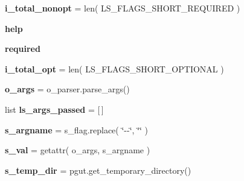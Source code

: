\begin{DoxyCompactItemize}
\item 
{\bfseries i\+\_\+total\+\_\+nonopt} = len( L\+S\+\_\+\+F\+L\+A\+G\+S\+\_\+\+S\+H\+O\+R\+T\+\_\+\+R\+E\+Q\+U\+I\+R\+ED )\hypertarget{namespacenegui_1_1pgdriveneestimator_aa4e6982ff99236ac13e0af4c4d6e8839}{}\label{namespacenegui_1_1pgdriveneestimator_aa4e6982ff99236ac13e0af4c4d6e8839}

\item 
{\bfseries help}\hypertarget{namespacenegui_1_1pgdriveneestimator_ad407ca10f30961eabc0630c21fe8da45}{}\label{namespacenegui_1_1pgdriveneestimator_ad407ca10f30961eabc0630c21fe8da45}

\item 
{\bfseries required}\hypertarget{namespacenegui_1_1pgdriveneestimator_ab5c3d005ba8659dc07a5f3171c7214df}{}\label{namespacenegui_1_1pgdriveneestimator_ab5c3d005ba8659dc07a5f3171c7214df}

\item 
{\bfseries i\+\_\+total\+\_\+opt} = len( L\+S\+\_\+\+F\+L\+A\+G\+S\+\_\+\+S\+H\+O\+R\+T\+\_\+\+O\+P\+T\+I\+O\+N\+AL )\hypertarget{namespacenegui_1_1pgdriveneestimator_a3c6b1b9d9500e05eca62433ac13c8692}{}\label{namespacenegui_1_1pgdriveneestimator_a3c6b1b9d9500e05eca62433ac13c8692}

\item 
{\bfseries o\+\_\+args} = o\+\_\+parser.\+parse\+\_\+args()\hypertarget{namespacenegui_1_1pgdriveneestimator_abff5b751b69197ab0c78f53cf34e3a05}{}\label{namespacenegui_1_1pgdriveneestimator_abff5b751b69197ab0c78f53cf34e3a05}

\item 
list {\bfseries ls\+\_\+args\+\_\+passed} = \mbox{[}$\,$\mbox{]}\hypertarget{namespacenegui_1_1pgdriveneestimator_a8bd374d85a2f54f7d6086c3560fba734}{}\label{namespacenegui_1_1pgdriveneestimator_a8bd374d85a2f54f7d6086c3560fba734}

\item 
{\bfseries s\+\_\+argname} = s\+\_\+flag.\+replace( \char`\"{}-\/-\/\char`\"{}, \char`\"{}\char`\"{} )\hypertarget{namespacenegui_1_1pgdriveneestimator_af8fac37bc1806ab9f054b8c4754e669e}{}\label{namespacenegui_1_1pgdriveneestimator_af8fac37bc1806ab9f054b8c4754e669e}

\item 
{\bfseries s\+\_\+val} = getattr( o\+\_\+args, s\+\_\+argname )\hypertarget{namespacenegui_1_1pgdriveneestimator_a801907b0dbfc713d2a817781f2b3c7d4}{}\label{namespacenegui_1_1pgdriveneestimator_a801907b0dbfc713d2a817781f2b3c7d4}

\item 
{\bfseries s\+\_\+temp\+\_\+dir} = pgut.\+get\+\_\+temporary\+\_\+directory()\hypertarget{namespacenegui_1_1pgdriveneestimator_a660fa9f1c3276022986893efbe9a3c76}{}\label{namespacenegui_1_1pgdriveneestimator_a660fa9f1c3276022986893efbe9a3c76}


\end{DoxyCompactItemize}
